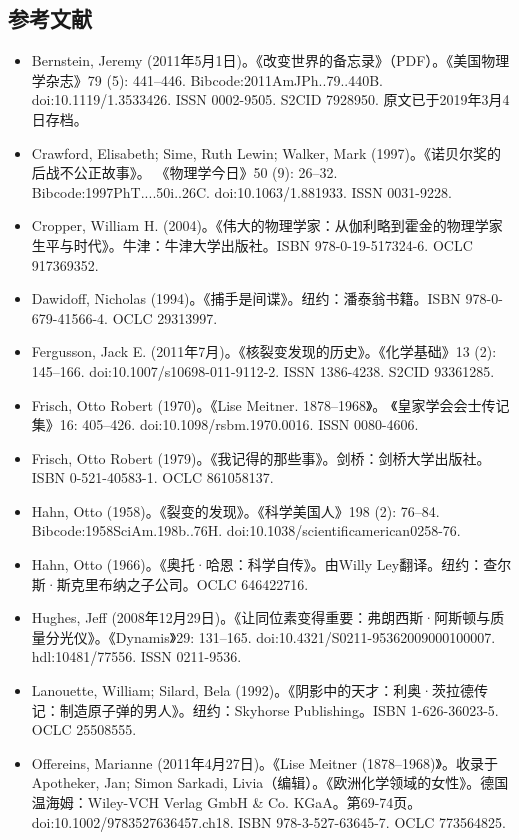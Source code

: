 \subsection{参考文献}
\begin{itemize}
\item Bernstein, Jeremy (2011年5月1日)。《改变世界的备忘录》（PDF）。《美国物理学杂志》79 (5): 441–446. Bibcode:2011AmJPh..79..440B. doi:10.1119/1.3533426. ISSN 0002-9505. S2CID 7928950. 原文已于2019年3月4日存档。
\item Crawford, Elisabeth; Sime, Ruth Lewin; Walker, Mark (1997)。《诺贝尔奖的后战不公正故事》。 《物理学今日》50 (9): 26–32. Bibcode:1997PhT....50i..26C. doi:10.1063/1.881933. ISSN 0031-9228.
\item Cropper, William H. (2004)。《伟大的物理学家：从伽利略到霍金的物理学家生平与时代》。牛津：牛津大学出版社。ISBN 978-0-19-517324-6. OCLC 917369352.
\item Dawidoff, Nicholas (1994)。《捕手是间谍》。纽约：潘泰翁书籍。ISBN 978-0-679-41566-4. OCLC 29313997.
\item Fergusson, Jack E. (2011年7月)。《核裂变发现的历史》。《化学基础》13 (2): 145–166. doi:10.1007/s10698-011-9112-2. ISSN 1386-4238. S2CID 93361285.
\item Frisch, Otto Robert (1970)。《Lise Meitner. 1878–1968》。 《皇家学会会士传记集》16: 405–426. doi:10.1098/rsbm.1970.0016. ISSN 0080-4606.
\item Frisch, Otto Robert (1979)。《我记得的那些事》。剑桥：剑桥大学出版社。ISBN 0-521-40583-1. OCLC 861058137.
\item Hahn, Otto (1958)。《裂变的发现》。《科学美国人》198 (2): 76–84. Bibcode:1958SciAm.198b..76H. doi:10.1038/scientificamerican0258-76.
\item Hahn, Otto (1966)。《奥托·哈恩：科学自传》。由Willy Ley翻译。纽约：查尔斯·斯克里布纳之子公司。OCLC 646422716.
\item Hughes, Jeff (2008年12月29日)。《让同位素变得重要：弗朗西斯·阿斯顿与质量分光仪》。《Dynamis》29: 131–165. doi:10.4321/S0211-95362009000100007. hdl:10481/77556. ISSN 0211-9536.
\item Lanouette, William; Silard, Bela (1992)。《阴影中的天才：利奥·茨拉德传记：制造原子弹的男人》。纽约：Skyhorse Publishing。ISBN 1-626-36023-5. OCLC 25508555.
\item Offereins, Marianne (2011年4月27日)。《Lise Meitner (1878–1968)》。收录于Apotheker, Jan; Simon Sarkadi, Livia（编辑）。《欧洲化学领域的女性》。德国温海姆：Wiley-VCH Verlag GmbH & Co. KGaA。第69-74页。doi:10.1002/9783527636457.ch18. ISBN 978-3-527-63645-7. OCLC 773564825.

\end{itemize}
